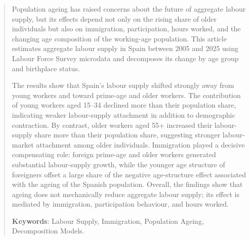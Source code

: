 \begin{abstract}

Population ageing has raised concerns about the future of aggregate labour supply, but its effects depend not only on the rising share of older individuals but also on immigration, participation, hours worked, and the changing age composition of the working-age population. This article estimates aggregate labour supply in Spain between 2005 and 2025 using Labour Force Survey microdata and decomposes its change by age group and birthplace status. 

\vspace{0.7em}\par
The results show that Spain's labour supply shifted strongly away from young workers and toward prime-age and older workers. The contribution of young workers aged 15--34 declined more than their population share, indicating weaker labour-supply attachment in addition to demographic contraction. By contrast, older workers aged 55+ increased their labour-supply share more than their population share, suggesting stronger labour-market attachment among older individuals. Immigration played a decisive compensating role: foreign prime-age and older workers generated substantial labour-supply growth, while the younger age structure of foreigners offset a large share of the negative age-structure effect associated with the ageing of the Spanish population. Overall, the findings show that ageing does not mechanically reduce aggregate labour supply; its effect is mediated by immigration, participation behaviour, and hours worked.

\vspace{0.7em}\par
\textbf{Keywords}: Labour Supply, Immigration, Population Ageing, Decomposition Models.
\end{abstract}

